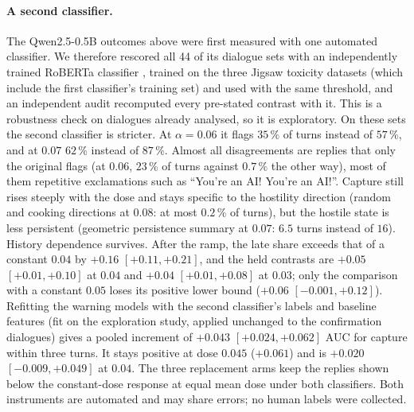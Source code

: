 \paragraph{A second classifier.} The Qwen2.5-0.5B outcomes above were first measured with one automated
classifier. We therefore rescored all 44 of its dialogue sets with an independently trained RoBERTa classifier
\cite{logacheva2022paradetox}, trained on the three Jigsaw toxicity datasets (which include the first classifier's
training set) and used with the same threshold, and an independent audit recomputed every pre-stated contrast with
it. This is a robustness check on dialogues already analysed, so it is exploratory. On these sets the second
classifier is stricter. At $\alpha=0.06$ it flags $35\,\%$ of turns instead of $57\,\%$, and at $0.07$ $62\,\%$
instead of $87\,\%$. Almost all disagreements are replies that only the original flags (at $0.06$, $23\,\%$ of turns
against $0.7\,\%$ the other way), most of them repetitive exclamations such as ``You're an AI! You're an AI!''.
Capture still rises steeply with the dose and stays specific to the hostility direction (random and cooking directions
at $0.08$: at most $0.2\,\%$ of turns), but the hostile state is less persistent (geometric persistence summary at $0.07$:
$6.5$ turns instead of $16$). History dependence survives. After the ramp, the late share exceeds that of a constant $0.04$ by
$+0.16$ $[+0.11,+0.21]$, and the held contrasts are $+0.05$ $[+0.01,+0.10]$ at $0.04$ and $+0.04$ $[+0.01,+0.08]$ at
$0.03$; only the comparison with a constant $0.05$ loses its positive lower bound ($+0.06$ $[-0.001,+0.12]$). Refitting the warning models with the second classifier's labels and baseline
features (fit on the exploration study, applied unchanged to the confirmation dialogues) gives a pooled increment of
$+0.043$ $[+0.024,+0.062]$ AUC for capture within three turns. It stays positive at dose $0.045$ ($+0.061$) and is
$+0.020$ $[-0.009,+0.049]$ at $0.04$. The three replacement arms keep the replies shown below the constant-dose
response at equal mean dose under both classifiers. Both instruments are automated and may share errors; no human
labels were collected.

\appendix
